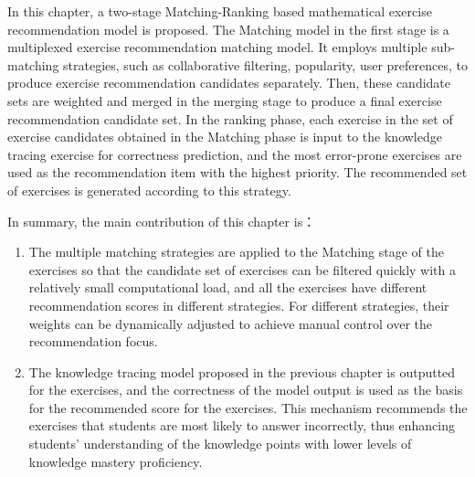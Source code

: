 In this chapter, a two-stage Matching-Ranking based mathematical exercise recommendation model is proposed. The Matching model in the first stage is a multiplexed exercise recommendation matching model. It employs multiple sub-matching strategies, such as collaborative filtering, popularity, user preferences, to produce exercise recommendation candidates separately. Then, these candidate sets are weighted and merged in the merging stage to produce a final exercise recommendation candidate set. In the ranking phase, each exercise in the set of exercise candidates obtained in the Matching phase is input to the knowledge tracing exercise for correctness prediction, and the most error-prone exercises are used as the recommendation item with the highest priority. The recommended set of exercises is generated according to this strategy.

In summary, the main contribution of this chapter is：
\begin{enumerate}
    \item The multiple matching strategies are applied to the Matching stage of the exercises so that the candidate set of exercises can be filtered quickly with a relatively small computational load, and all the exercises have different recommendation scores in different strategies. For different strategies, their weights can be dynamically adjusted to achieve manual control over the recommendation focus.
    \item The knowledge tracing model proposed in the previous chapter is outputted for the exercises, and the correctness of the model output is used as the basis for the recommended score for the exercises. This mechanism recommends the exercises that students are most likely to answer incorrectly, thus enhancing students' understanding of the knowledge points with lower levels of knowledge mastery proficiency.
\end{enumerate}